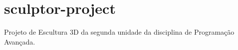 \chapter{sculptor-\/project}
\hypertarget{md__r_e_a_d_m_e}{}\label{md__r_e_a_d_m_e}
\label{md__r_e_a_d_m_e_autotoc_md0}%
%
Projeto de Escultura 3D da segunda unidade da disciplina de Programação Avançada. 